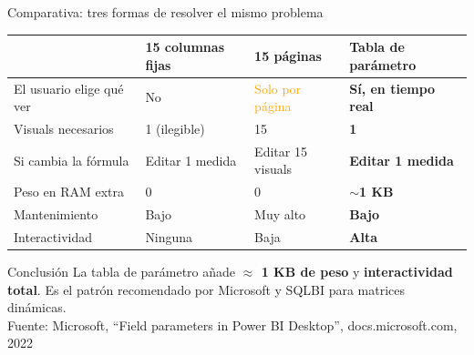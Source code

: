 \documentclass[aspectratio=169,10pt]{beamer}
\newcommand{\src}[1]{{\tiny\color{gray}Fuente: #1}}
\begin{document}
\begin{frame}{Comparativa: tres formas de resolver el mismo problema}

\begin{center}
\begin{tabular}{lp{3cm}p{3cm}p{3.4cm}}
\toprule
 & \textbf{15 columnas fijas} & \textbf{15 p\'aginas} & \textbf{Tabla de par\'ametro} \\
\midrule
El usuario elige qu\'e ver
  & \textcolor{red!70!black}{No}
  & \textcolor{orange}{Solo por p\'agina}
  & \textcolor{green!50!black}{\textbf{S\'i, en tiempo real}} \\
\addlinespace
Visuals necesarios
  & 1 (ilegible)
  & 15
  & \textbf{1} \\
\addlinespace
Si cambia la f\'ormula
  & Editar 1 medida
  & \textcolor{red!70!black}{Editar 15 visuals}
  & \textbf{Editar 1 medida} \\
\addlinespace
Peso en RAM extra
  & 0
  & 0
  & \textbf{$\sim$1 KB} \\
\addlinespace
Mantenimiento
  & Bajo
  & \textcolor{red!70!black}{Muy alto}
  & \textbf{Bajo} \\
\addlinespace
Interactividad
  & Ninguna
  & Baja
  & \textbf{Alta} \\
\bottomrule
\end{tabular}
\end{center}

\bigskip
\begin{exampleblock}{Conclusi\'on}
La tabla de par\'ametro a\~nade \textbf{$\approx$ 1 KB de peso} y
\textbf{interactividad total}.
Es el patr\'on recomendado por Microsoft y SQLBI para matrices din\'amicas.\\[4pt]
\src{Microsoft, ``Field parameters in Power BI Desktop'', docs.microsoft.com, 2022}
\end{exampleblock}

\end{frame}
\end{document}

